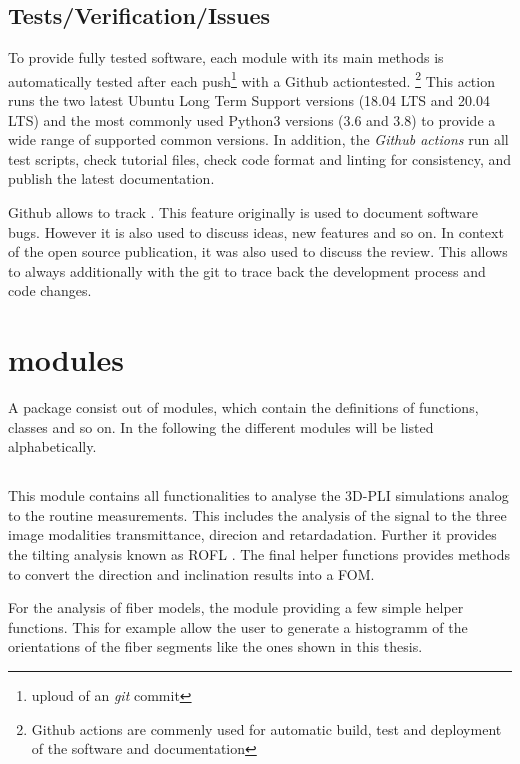 \subsection{Tests/Verification/Issues}
%
To provide fully tested software, each module with its main methods is automatically tested after each push\footnote{uploud of an \textit{git} commit} with a Github actiontested. \footnote{Github actions are commenly used for automatic build, test and deployment of the software and documentation}
This action runs the two latest Ubuntu Long Term Support versions (18.04 LTS and 20.04 LTS) and the most commonly used Python3 versions (3.6 and 3.8) to provide a wide range of supported common versions.
In addition, the \textit{Github actions} run all test scripts, check tutorial files, check code format and linting for consistency, and publish the latest documentation.
%
\par
%
Github allows to track .
This feature originally is used to document software bugs.
However it is also used to discuss ideas, new features and so on.
In context of the open source publication, it was also used to discuss the review.
This allows to always additionally with the git  to trace back the development process and code changes.
%
% 
%
% 
\section{modules}
%
A \python{} package consist out of modules, which contain the definitions of functions, classes and so on.
In the following the different modules will be listed alphabetically.
%
%
%
\subsection{}
%
This module contains all functionalities to analyse the \ac{3D-PLI} simulations analog to the routine measurements.
This includes the analysis of the signal to the three image modalities transmittance, direcion and retardadation.
Further it provides the tilting analysis known as \ac{ROFL} \cite{Schmitz2018}.
The final helper functions provides methods to convert the direction and inclination results into a \ac{FOM}.
\par
For the analysis of fiber models, the module providing a few simple helper functions.
This for example allow the user to generate a histogramm of the orientations of the fiber segments like the ones shown in this thesis.
%
